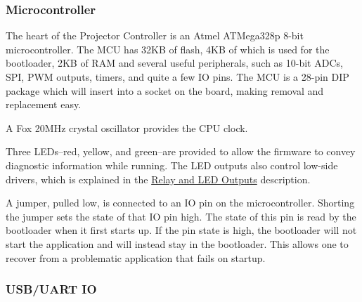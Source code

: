 \documentclass{article}
\begin{document}
\subsubsection{Microcontroller} \label{Microcontroller_sssec}
The heart of the Projector Controller is an Atmel ATMega328p 8-bit microcontroller.  The MCU has
32KB of flash, 4KB of which is used for the bootloader, 2KB of RAM and several useful peripherals,
such as 10-bit ADCs, SPI, PWM outputs, timers, and quite a few IO pins.  The MCU is a 28-pin DIP
package which will insert into a socket on the board, making removal and replacement easy.

A Fox 20MHz crystal oscillator provides the CPU clock.

Three LEDs--red, yellow, and green--are provided to allow the firmware to convey diagnostic
information while running.  The LED outputs also control low-side drivers, which is explained in the
\hyperref[RelayLED_sssec]{Relay and LED Outputs} description.

A jumper, pulled low, is connected to an IO pin on the microcontroller.  Shorting the jumper sets
the state of that IO pin high.  The state of this pin is read by the bootloader when it first starts
up.  If the pin state is high, the bootloader will not start the application and will instead stay
in the bootloader.  This allows one to recover from a problematic application that fails on startup.

\subsubsection{USB/UART IO} \label{USB_UART_sssec}
\end{document}
